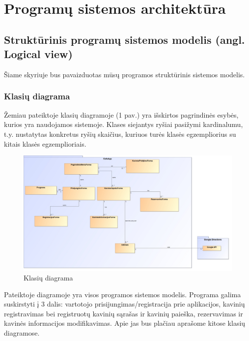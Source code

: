 \documentclass{VUMIFPSkursinis}
\begin{document}
{{{{{\begin{center}
\begin{table}[H]
\begin{tabular}{|p{2cm}|p{}|p{}|}
	\hline 	
	\end{tabular}
	
	\label{table:Juridiniaireikalavimai}
	\end{table}

\end{center}

\pagebreak

\section{Programų sistemos architektūra}

\subsection{Struktūrinis programų sistemos modelis (angl. Logical view)}
Šiame skyriuje bus pavaizduotas mūsų programos struktūrinis sistemos modelis.
\subsubsection{Klasių diagrama}



Žemiau pateiktoje klasių diagramoje (1 pav.) yra išskirtos pagrindinės esybės, kurios yra naudojamos sistemoje. Klases siejantys ryšiai pasižymi kardinalumu, t.y. nustatytas konkretus ryšių skaičius, kuriuos turės klasės egzempliorius su kitais klasės egzemplioriais.
\newline
\newline

\begin{figure}[H]
    \centering
    \includegraphics[width=\textwidth,height=\textheight,keepaspectratio]{img/Model} 
    \caption{Klasių diagrama}
    \label{img:Model}
\end{figure}
Pateiktoje diagramoje yra visos programos sistemos modelis. Programa galima suskirstyti į 3 dalis: vartotojo prisijungimas/registracija prie aplikacijos, kavinių registravimas bei registruotų kavinių sąrašas ir kavinių paieška, rezervavimas ir kavinės informacijos modifikavimas. Apie jas bus plačiau aprašome kitose klasių diagramose.
\pagebreak

}}}}}
\end{document}
